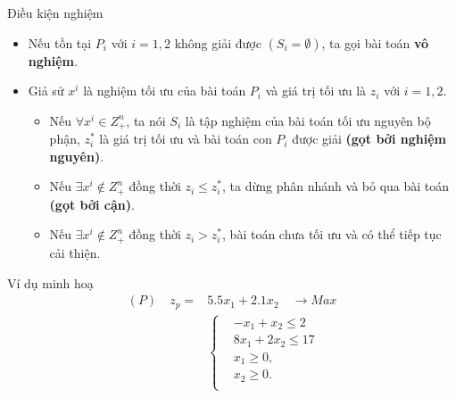 \documentclass{beamer}
\begin{document}
\begin{frame}{Điều kiện nghiệm}
\begin{itemize}
\item Nếu tồn tại $P_i$ với $i=1,2$ không giải được $(S_i = \emptyset )$, ta gọi bài toán \textbf{vô nghiệm}.
\item Giả sử $x^i$ là nghiệm tối ưu của bài toán $P_i$ và giá trị tối ưu là $z_i$ với $i = 1,2$.
\begin{itemize}
\item Nếu $\forall x^i \in Z^n_+$, ta nói $S_i$ là tập nghiệm của bài toán tối ưu nguyên bộ phận, $z^*_i$ là giá trị tối ưu và bài toán con $P_i$ được giải \textbf{(gọt bởi nghiệm nguyên)}.
\item Nếu $\exists x^i \notin Z^n_+$ đồng thời $z_i \leq z^*_i$, ta dừng phân nhánh và bỏ qua bài toán \textbf{(gọt bởi cận)}.
\item Nếu $\exists x^i \notin Z^n_+$ đồng thời $z_i > z^*_i$, bài toán chưa tối ưu và có thể tiếp tục cải thiện.
\iffalse
Với $x^i_{j^'}$ là nghiệm không nguyên và phân thành 2 bài toán con $P_3$ với tập nghiệm $S_l := S_i \cap \{ (x,y): x_{j^{'}} \leq \lfloor x_{j^{'}} \rfloor \}$, $P_l$ với $S_l := S_i \cap \{ (x,y): x_{j^{'}} \geq \lceil x_{j^{'}} \rceil \}$ trong đó $l=3,4$ và lặp lại quá trình.
\fi
\end{itemize}
\end{itemize}
\end{frame}

\begin{frame}{Ví dụ minh hoạ}
    \begin{equation*}
        \begin{split}
            (P) \quad z_p= & 5.5x_1 + 2.1x_2 \quad \longrightarrow Max \\
            & \left\{\begin{split}
            & -x_1 + x_2 \leq 2 \\
            & 8x_1 + 2x_2 \leq 17 \\
            &x_1 \geq 0, \\
            &x_2 \geq 0. \\
            \end{split}\right. \\
        \end{split}
    \end{equation*}
\end{frame}
\end{document}

